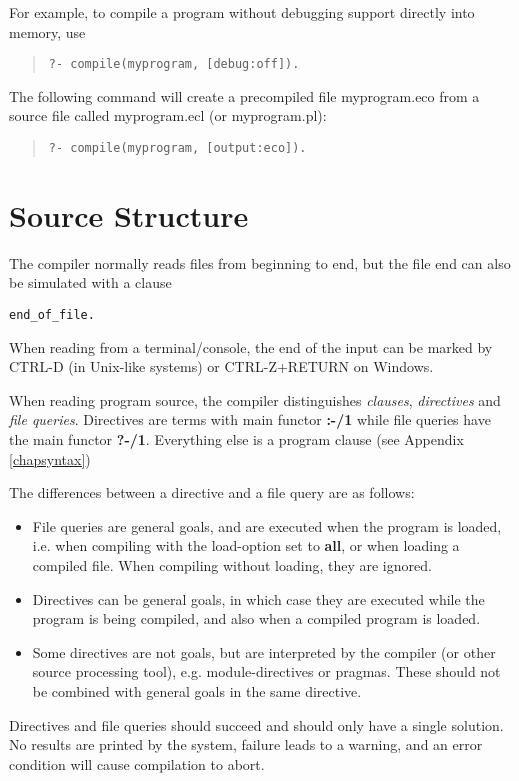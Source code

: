 For example, to compile a program without debugging support directly into
memory, use
\begin{quote}\begin{verbatim}
?- compile(myprogram, [debug:off]).
\end{verbatim}
\end{quote}
The following command will create a precompiled file myprogram.eco from a
source file called myprogram.ecl (or myprogram.pl):
\begin{quote}\begin{verbatim}
?- compile(myprogram, [output:eco]).
\end{verbatim}
\end{quote}


\section{Source Structure}

The compiler normally reads files from beginning to end, but the
file end can also be simulated with a clause
\begin{verbatim}
end_of_file.
\end{verbatim}
When reading from a terminal/console, the end of the input can be
marked by CTRL-D (in Unix-like systems) or CTRL-Z+RETURN on Windows.

When reading program source, the compiler distinguishes
{\it clauses}, {\it directives} and {\it file queries}.
Directives are terms with main functor
{\bf :-/1}
while file queries have the main functor
{\bf ?-/1}.  Everything else is a program clause (see Appendix \ref{chapsyntax})

The differences between a directive and a file query are as follows:
\begin{itemize}
\item File queries are general goals, and are executed when the program
	is loaded, i.e. when compiling with the load-option set to {\bf all},
	or when loading a compiled file.  When compiling without loading,
	they are ignored.
\item Directives can be general goals, in which case they are executed
	while the program is being compiled, and also when a compiled
	program is loaded.
\item Some directives are not goals, but are interpreted by the compiler
	(or other source processing tool), e.g. module-directives or
	pragmas.  These should not be combined with general goals in
	the same directive.
\end{itemize}
Directives and file queries should succeed and should only have a single
solution. No results are printed by the system, failure leads to a warning,
and an error condition will cause compilation to abort.

